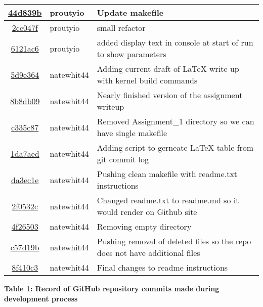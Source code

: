 \begin{tabular}{| c | l | l |}
\href{https://github.com/proutyio/OSU_CS444/commit/44d839bc92cf0e4ecbe8015cf2857e80e2a9fcf5}{44d839b} & proutyio & Update makefile\\\hline
\href{https://github.com/proutyio/OSU_CS444/commit/2cc047f08a9c3fa13c30905f6ffcf4d3067497d8}{2cc047f} & proutyio & small refactor\\\hline
\href{https://github.com/proutyio/OSU_CS444/commit/6121ac6e5453cab5ffe44448281b842eac6c778e}{6121ac6} & proutyio & added display text in console at start of run to show parameters\\\hline
\href{https://github.com/proutyio/OSU_CS444/commit/5d9e3643d83b9092afdb37d7a98c30c822c2a1e6}{5d9e364} & natewhit44 & Adding current draft of LaTeX write up with kernel build commands\\\hline
\href{https://github.com/proutyio/OSU_CS444/commit/8b8db09905b59bd51df0ad0ab2473ff98a56a39d}{8b8db09} & natewhit44 & Nearly finished version of the assignment writeup\\\hline
\href{https://github.com/proutyio/OSU_CS444/commit/c335c8715109bf6bda6712b402b51b97267a372a}{c335c87} & natewhit44 & Removed Assignment\_1 directory so we can have single makefile\\\hline
\href{https://github.com/proutyio/OSU_CS444/commit/1da7aed9fcd7b98563d61560fc9d8320f7906cec}{1da7aed} & natewhit44 & Adding script to gerneate LaTeX table from git commit log\\\hline
\href{https://github.com/proutyio/OSU_CS444/commit/da3ec1ea159dc367277dfd1e12715c05dfa4acf1}{da3ec1e} & natewhit44 & Pushing clean makefile with readme.txt instructions\\\hline
\href{https://github.com/proutyio/OSU_CS444/commit/2f0532c10b8def044a8e84cf549266f30882e33b}{2f0532c} & natewhit44 & Changed readme.txt to readme.md so it would render on Github site\\\hline
\href{https://github.com/proutyio/OSU_CS444/commit/4f26503522ced73a4fe68272c02d770939288367}{4f26503} & natewhit44 & Removing empty directory\\\hline
\href{https://github.com/proutyio/OSU_CS444/commit/c57d19b05ada8a089a64ca96d03cb29d4a1da345}{c57d19b} & natewhit44 & Pushing removal of deleted files so the repo does not have additional files\\\hline
\href{https://github.com/proutyio/OSU_CS444/commit/8f410c397ba054b6d7fe5b7c950e685dd4f69781}{8f410c3} & natewhit44 & Final changes to readme instructions\\\hline
\end{tabular}
\vspace{2mm}

\small{\bfseries Table 1: Record of GitHub repository commits made during development process}
